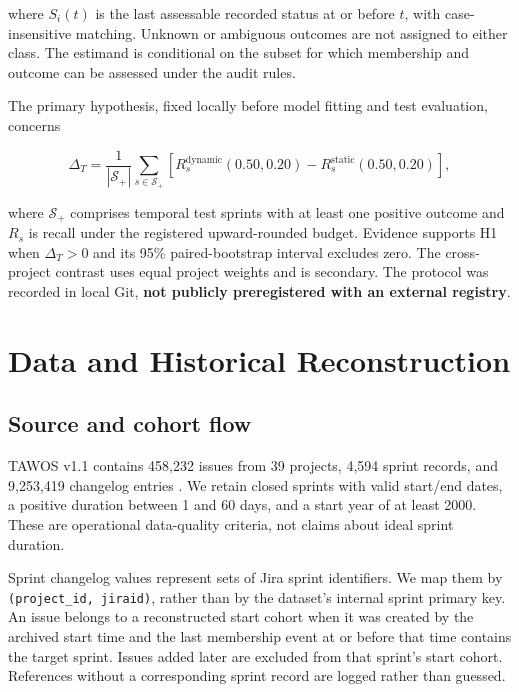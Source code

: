 \documentclass[11pt,a4paper]{article}
\begin{document}
where \(S_i(t)\) is the last assessable recorded status at or before \(t\), with case-insensitive matching. Unknown or ambiguous outcomes are not assigned to either class. The estimand is conditional on the subset for which membership and outcome can be assessed under the audit rules.

The primary hypothesis, fixed locally before model fitting and test evaluation, concerns

\[
\Delta_T=\frac{1}{|\mathcal S_+|}\sum_{s\in\mathcal S_+}
\left[R_s^{\mathrm{dynamic}}(0.50,0.20)
-R_s^{\mathrm{static}}(0.50,0.20)\right],
\]

where \(\mathcal S_+\) comprises temporal test sprints with at least one positive outcome and \(R_s\) is recall under the registered upward-rounded budget. Evidence supports H1 when \(\Delta_T>0\) and its 95\% paired-bootstrap interval excludes zero. The cross-project contrast uses equal project weights and is secondary. The protocol was recorded in local Git, \textbf{not publicly preregistered with an external registry}.

\section{Data and Historical Reconstruction}\label{data-and-historical-reconstruction}

\subsection{Source and cohort flow}\label{source-and-cohort-flow}

TAWOS v1.1 contains 458,232 issues from 39 projects, 4,594 sprint records, and 9,253,419 changelog entries \cite{tawosv11}. We retain closed sprints with valid start/end dates, a positive duration between 1 and 60 days, and a start year of at least 2000. These are operational data-quality criteria, not claims about ideal sprint duration.

Sprint changelog values represent sets of Jira sprint identifiers. We map them by \texttt{(project\_\allowbreak{}id,\ jiraid)}, rather than by the dataset's internal sprint primary key. An issue belongs to a reconstructed start cohort when it was created by the archived start time and the last membership event at or before that time contains the target sprint. Issues added later are excluded from that sprint's start cohort. References without a corresponding sprint record are logged rather than guessed.
\end{document}
